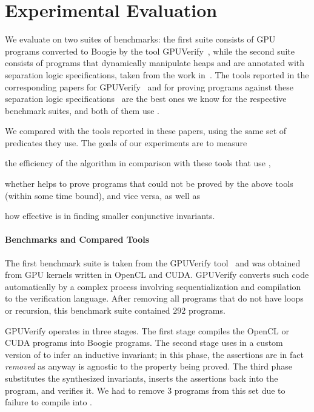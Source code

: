 
\section{Experimental Evaluation}
\label{sec:experiments}
We evaluate \sorcar on two suites of benchmarks: the first suite consists of GPU programs converted to Boogie by the tool GPUVerify~\cite{DBLP:conf/oopsla/BettsCDQT12,DBLP:conf/oopsla/ChongDKKQ13}, while the second suite consists of programs that dynamically manipulate heaps and are annotated with separation logic specifications, taken from
the work in~\cite{DBLP:conf/tacas/Neider0MS018}.
The tools reported in the corresponding papers for GPUVerify~\cite{DBLP:conf/oopsla/BettsCDQT12,DBLP:conf/oopsla/ChongDKKQ13} and for proving programs against these separation logic specifications~\cite{DBLP:conf/tacas/Neider0MS018} are the best ones we know for the respective benchmark suites, and both of them use \houdini.

We compared \sorcar with the tools reported in these papers, using the same set of predicates they use.
The goals of our experiments are to measure
\begin{enumerate*}[label={(\alph*)}]
    \item the efficiency of the \sorcar algorithm in comparison with these tools that use \houdini,
    \item whether \sorcar helps to prove programs that could not be proved by the above tools (within some time bound), and vice versa, as well as
    \item how effective \sorcar is in finding smaller conjunctive invariants. %
\end{enumerate*}

\paragraph{Benchmarks and Compared Tools}
The first benchmark suite is taken from the 
GPUVerify tool~\cite{DBLP:conf/oopsla/BettsCDQT12,DBLP:conf/oopsla/ChongDKKQ13} and was obtained from GPU kernels written in OpenCL and CUDA.
GPUVerify converts such code automatically by a complex process involving sequentialization and compilation to the \boogie verification language.
After removing all programs that do not have loops or recursion, this benchmark suite contained $292$ programs. 

GPUVerify operates in three stages.
The first stage compiles the OpenCL or CUDA programs into Boogie programs.
The second stage uses \houdini in a custom version of \boogie to infer an inductive invariant;
in this phase, the assertions are in fact \emph{removed} as \houdini anyway is agnostic to the property being proved.
The third phase substitutes the synthesized invariants, inserts the assertions back into the \boogie program, and verifies it. 
We had to remove 3 programs from this set due to failure to compile into \boogie. 

